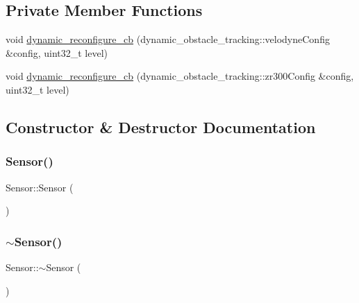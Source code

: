 \subsection*{Private Member Functions}
\begin{DoxyCompactItemize}
\item 
void \hyperlink{classSensor_aa95e03d6992d49345dca8c16129dc3c6}{dynamic\+\_\+reconfigure\+\_\+cb} (dynamic\+\_\+obstacle\+\_\+tracking\+::velodyne\+Config \&config, uint32\+\_\+t level)
\item 
void \hyperlink{classSensor_ad0edde48f6e1472b6535d5c07c36b610}{dynamic\+\_\+reconfigure\+\_\+cb} (dynamic\+\_\+obstacle\+\_\+tracking\+::zr300\+Config \&config, uint32\+\_\+t level)
\end{DoxyCompactItemize}


\subsection{Constructor \& Destructor Documentation}
\mbox{\label{classSensor_a342d6d11ef572c8cba92cb76fb1a294b}} 
\subsubsection{\texorpdfstring{Sensor()}{Sensor()}\hspace{0.1cm}{\footnotesize\ttfamily [1/2]}}
{\footnotesize\ttfamily Sensor\+::\+Sensor (\begin{DoxyParamCaption}{ }\end{DoxyParamCaption})}

\mbox{\label{classSensor_aee8c70e7ef05ce65e7ee33686b5d7db2}} 
\subsubsection{\texorpdfstring{$\sim$\+Sensor()}{~Sensor()}\hspace{0.1cm}{\footnotesize\ttfamily [1/2]}}
{\footnotesize\ttfamily Sensor\+::$\sim$\+Sensor (\begin{DoxyParamCaption}{ }\end{DoxyParamCaption})}

\mbox{\label{classSensor_a342d6d11ef572c8cba92cb76fb1a294b}} 
